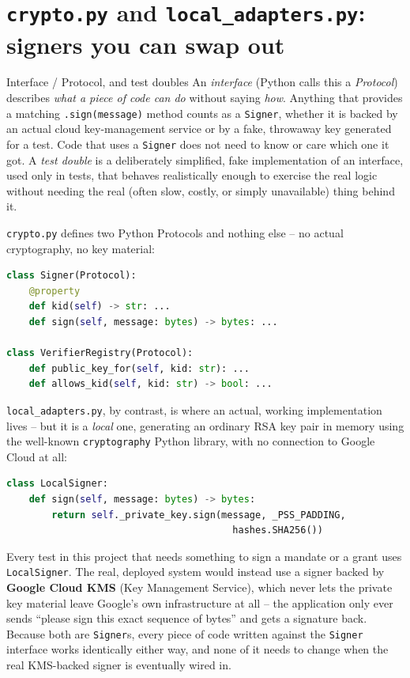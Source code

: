 \documentclass[11pt]{report}
\newcommand{\file}[1]{\texttt{#1}}
\newcommand{\code}[1]{\texttt{#1}}
\begin{document}
\section{\file{crypto.py} and \file{local\_adapters.py}: signers you can swap out}

\begin{concept}{Interface / Protocol, and test doubles}
An \emph{interface} (Python calls this a \emph{Protocol}) describes
\emph{what a piece of code can do} without saying \emph{how}. Anything
that provides a matching \code{.sign(message)} method counts as a
\code{Signer}, whether it is backed by an actual cloud key-management
service or by a fake, throwaway key generated for a test. Code that uses
a \code{Signer} does not need to know or care which one it got. A
\emph{test double} is a deliberately simplified, fake implementation of
an interface, used only in tests, that behaves realistically enough to
exercise the real logic without needing the real (often slow, costly, or
simply unavailable) thing behind it.
\end{concept}

\file{crypto.py} defines two Python Protocols and nothing else -- no
actual cryptography, no key material:

\begin{lstlisting}[language=Python]
class Signer(Protocol):
    @property
    def kid(self) -> str: ...
    def sign(self, message: bytes) -> bytes: ...

class VerifierRegistry(Protocol):
    def public_key_for(self, kid: str): ...
    def allows_kid(self, kid: str) -> bool: ...
\end{lstlisting}

\file{local\_adapters.py}, by contrast, is where an actual, working
implementation lives -- but it is a \emph{local} one, generating an
ordinary RSA key pair in memory using the well-known \code{cryptography}
Python library, with no connection to Google Cloud at all:

\begin{lstlisting}[language=Python]
class LocalSigner:
    def sign(self, message: bytes) -> bytes:
        return self._private_key.sign(message, _PSS_PADDING,
                                        hashes.SHA256())
\end{lstlisting}

Every test in this project that needs something to sign a mandate or a
grant uses \code{LocalSigner}. The real, deployed system would instead use
a signer backed by \textbf{Google Cloud KMS} (Key Management Service),
which never lets the private key material leave Google's own
infrastructure at all -- the application only ever sends ``please sign
this exact sequence of bytes'' and gets a signature back. Because both are
\code{Signer}s, every piece of code written against the \code{Signer}
interface works identically either way, and none of it needs to change
when the real KMS-backed signer is eventually wired in.
\end{document}

